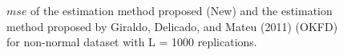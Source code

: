 \documentclass[12pt,]{article}
\theoremstyle{definition}
\theoremstyle{definition}
\theoremstyle{definition}
\theoremstyle{remark}
\begin{document}
\begin{figure}[htbp]
  \caption{$mse$ of the estimation method proposed (New) and the estimation method proposed by Giraldo, Delicado, and Mateu (2011) (OKFD) for non-normal dataset with L = 1000 replications.}
\end{figure}
\end{document}
